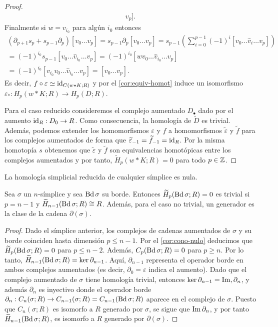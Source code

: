 \begin{proof}
\begin{gather*}
		v_{p}].
	\end{gather*}
	Finalmente si $w = v_{i_0}$ para algún $i_{0}$ entonces
	\begin{gather*}
		(\partial_{p+1}s_{p}+s_{p-1}\partial_{p})[v_{0}\ldots v_{p}]=s_{p-1}\partial_{p}
		[v_{0}\ldots v_{p}] =s_{p-1}\left( \sum_{i=0}^{p-1}(-1)^{i}[v_{0}\ldots \hat{v}
		_{i}\ldots v_{p}] \right) \\ =(-1)^{i_0}s_{p-1}[v_{0}\ldots \hat{v}_{i_0}\ldots
		v_{p}] =(-1)^{i_0}[wv_{0}\ldots \hat{v}_{i_0}\ldots v_{p}] \\ =(-1)^{i_0}[v_{i_0}
		v_{0}\ldots \hat{v}_{i_0}\ldots v_{p}] =[v_{0}\ldots v_{p}].
	\end{gather*}
	Es decir, $f \circ \varepsilon \simeq \operatorname{id}_{C(w \ast K;R)}$ y por el
	\autoref{cor:equiv-homot} induce un isomorfismo
	$\varepsilon_{*}: H_{p}(w \ast K;R) \to H_{p}(D;R)$.
	
	Para el caso reducido consideremos el complejo aumentado $D_{\bullet}$ dado
	por el aumento $\operatorname{id}_{R}: D_{0}\to R$. Como consecuencia, la homología de
	$\widetilde{D}$ es trivial. Además, podemos extender los homomorfismos
	$\varepsilon$ y $f$ a homomorfismos $\widetilde{\varepsilon}$ y
	$\widetilde{f}$ para los complejos aumentados de forma que
	$\widetilde{\varepsilon}_{-1}= \widetilde{f}_{-1}= \operatorname{id}_{R}$. Por la misma homotopía
	$s$ obtenemos que $\widetilde{\varepsilon}$ y $\widetilde{f}$ son equivalencias
	homotópicas entre los complejos aumentados y por tanto,
	$\widetilde{H}_{p}(w \ast K;R) = 0$ para todo $p \in \mathbb{Z}$.
\end{proof}
\begin{corolario}
	\label{cor:cono-nulo} La homología simplicial reducida de cualquier símplice es
	nula.
\end{corolario}
\begin{corolario}
	Sea $\sigma$ un $n$-símplice y sea $\operatorname{Bd} \sigma$ su borde. Entonces
	$\widetilde{H}_{p}(\operatorname{Bd} \sigma;R) = 0$ es trivial si $p = n-1$ y
	$\widetilde{H}_{n-1}(\operatorname{Bd} \sigma; R) \cong R$. Además, para el caso no trivial,
	un generador es la clase de la cadena $\partial(\sigma)$.
\end{corolario}
\begin{proof}
	Dado el símplice anterior, los complejos de cadenas aumentados de $\sigma$ y
	su borde coinciden hasta dimensión $p \leq n-1$. Por el \autoref{cor:cono-nulo}
	deducimos que $\widetilde{H}_{p}(\operatorname{Bd} \sigma; R) = 0$ para $p \leq n-2$. Además,
	$C_{p}(\operatorname{Bd} \sigma; R) = 0$ para $p \geq n$. Por lo tanto, $\widetilde{H}_{n-1}(
	\operatorname{Bd}\sigma;R)=\ker \partial_{n-1}$. Aquí, $\partial_{n-1}$ representa el operador
	borde en ambos complejos aumentados (es decir, $\partial_{0}=\varepsilon$ indica
	el aumento). Dado que el complejo aumentado de $\sigma$ tiene homología trivial,
	entonces $\ker \partial_{n-1}=\operatorname{Im}, \partial_{n}$, y además $\partial_{n}$ es inyectivo
	donde el operador borde $\partial_{n}: C_{n}(\sigma; R) \rightarrow C_{n-1}(\sigma
	; R) = C_{n-1}(\operatorname{Bd} \sigma; R)$ aparece en el complejo de $\sigma$. Puesto que
	$C_{n}(\sigma;R)$ es isomorfo a $R$ generado por $\sigma$, se sigue que $\operatorname{Im} \partial
	_{n}$, y por tanto $\widetilde{H}_{n-1}(\operatorname{Bd}\sigma;R)$, es isomorfo a $R$ generado
	por $\partial(\sigma)$.
\end{proof}

